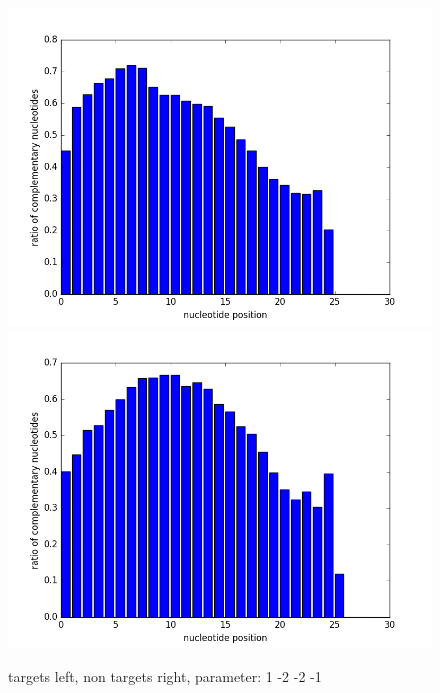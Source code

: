 \documentclass[12pt]{article}
\begin{document}
\begin{figure}
\includegraphics[scale=0.2]{results/ratio1-2-2-1.png}
\includegraphics[scale=0.2]{results/non-ratio1-2-2-1.png}
\caption {targets left, non targets right, parameter: 1 -2 -2 -1}
\label{fig:plot2}
\end{figure}
\end{document}
